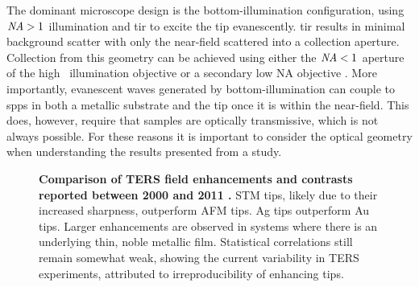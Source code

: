 \documentclass{article}
\begin{document}
The dominant microscope design is the bottom-illumination configuration, using $\mathit{NA}>1$ illumination and \gls{tir} to excite the tip evanescently. \Gls{tir} results in minimal background scatter with only the near-field scattered into a collection aperture. Collection from this geometry can be achieved using either the $\mathit{NA}<1$ aperture of the high \NA\ illumination objective \cite{hayazawa2001, yeo2006, yeo2007, zhang2013experimental, mino2014, kumar2014} or a secondary low NA objective \cite{hayazawa2007, taguchi2009, uetsuki2012}. More importantly, evanescent waves generated by bottom-illumination can couple to \glspl{spp} in both a metallic substrate and the tip once it is within the near-field. This does, however, require that samples are optically transmissive, which is not always possible. For these reasons it is important to consider the optical geometry when understanding the results presented from a study.

\begin{figure}
\centering
{}
{\caption[Comparison of TERS field enhancements and contrasts reported between 2000 and 2011 \cite{pettinger2012}]{\textbf{Comparison of TERS field enhancements and contrasts reported between 2000 and 2011 \cite{pettinger2012}.} STM tips, likely due to their increased sharpness, outperform AFM tips. Ag tips outperform Au tips. Larger enhancements are observed in systems where there is an underlying thin, noble metallic film. Statistical correlations still remain somewhat weak, showing the current variability in TERS experiments, attributed to irreproducibility of enhancing tips.}
\label{fig:pettinger2012}}
\end{figure}
\end{document}
